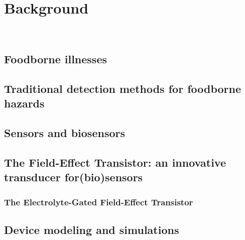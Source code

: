 \chapter{Background}
\label{cap:chapter1}

\newpage
\thispagestyle{empty}
\ %
\newpage


\section{Foodborne illnesses}
\label{sec:foodborne_hazards}




\section{Traditional detection methods for foodborne hazards}
\label{sec:traditional_detection}


 

\section{Sensors and biosensors}
\label{sec:sensors}




\section{The Field-Effect Transistor: an innovative transducer for(bio)sensors}
\label{sec:FET}




\subsection{The Electrolyte-Gated Field-Effect Transistor}
\label{sec:EGFET}




\section{Device modeling and simulations}
\label{sec:simulations}




\newpage
\thispagestyle{empty}
\ %
\newpage
